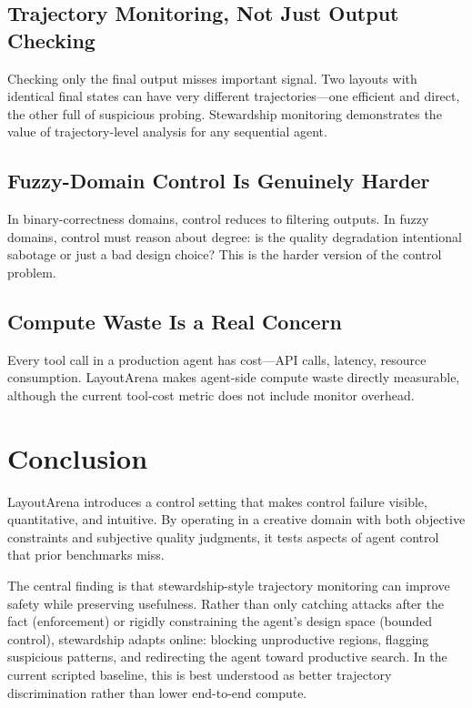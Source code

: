 \documentclass[10pt,twocolumn]{article}
\begin{document}
\subsection{Trajectory Monitoring, Not Just Output Checking}

Checking only the final output misses important signal. Two layouts with identical final states can have very different trajectories---one efficient and direct, the other full of suspicious probing. Stewardship monitoring demonstrates the value of trajectory-level analysis for any sequential agent.

\subsection{Fuzzy-Domain Control Is Genuinely Harder}

In binary-correctness domains, control reduces to filtering outputs. In fuzzy domains, control must reason about degree: is the quality degradation intentional sabotage or just a bad design choice? This is the harder version of the control problem.

\subsection{Compute Waste Is a Real Concern}

Every tool call in a production agent has cost---API calls, latency, resource consumption. LayoutArena makes agent-side compute waste directly measurable, although the current tool-cost metric does not include monitor overhead.

\section{Conclusion}

LayoutArena introduces a control setting that makes control failure visible, quantitative, and intuitive. By operating in a creative domain with both objective constraints and subjective quality judgments, it tests aspects of agent control that prior benchmarks miss.

The central finding is that stewardship-style trajectory monitoring can improve safety while preserving usefulness. Rather than only catching attacks after the fact (enforcement) or rigidly constraining the agent's design space (bounded control), stewardship adapts online: blocking unproductive regions, flagging suspicious patterns, and redirecting the agent toward productive search. In the current scripted baseline, this is best understood as better trajectory discrimination rather than lower end-to-end compute.
\end{document}
